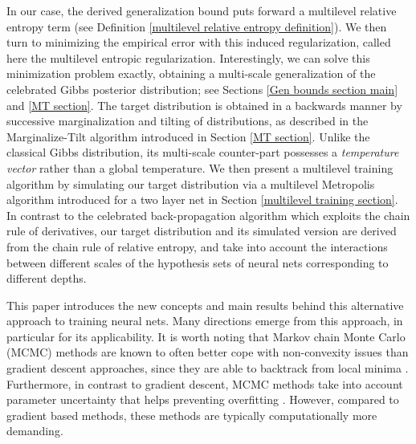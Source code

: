 \documentclass{article}
\begin{document}
In our case, the derived generalization bound puts forward a multilevel relative entropy term (see Definition \ref{multilevel relative entropy definition}). We then turn to minimizing the empirical error with this induced regularization, called here the multilevel entropic regularization. Interestingly, we can solve this minimization problem exactly, obtaining a multi-scale generalization of the celebrated Gibbs posterior distribution; see Sections \ref{Gen bounds section main} and \ref{MT section}. The  target distribution is obtained in a backwards manner by successive marginalization and tilting of distributions, as described in the Marginalize-Tilt algorithm introduced in Section \ref{MT section}. Unlike the classical Gibbs distribution, its multi-scale counter-part possesses a \emph{temperature vector} rather than a global temperature. We then present a multilevel training algorithm by simulating our target distribution via a multilevel Metropolis algorithm introduced for a two layer net in Section \ref{multilevel training section}.  In contrast to the celebrated back-propagation algorithm which exploits the chain rule of derivatives, our target distribution and its simulated version are derived from the chain rule of relative entropy, and take into account the interactions between different scales of the hypothesis sets of neural nets corresponding to different depths.

This paper introduces the new concepts and main results behind this alternative approach to training neural nets. Many directions emerge from this approach, in particular for its applicability. It is worth noting that Markov chain Monte Carlo (MCMC) methods are known to often better cope with non-convexity issues than gradient descent approaches, since they are able to backtrack from local minima \cite{geman1987stochastic}. Furthermore, in contrast to gradient descent, MCMC methods take into account parameter uncertainty that helps preventing overfitting \cite{welling2011bayesian}. However, compared to gradient based methods, these methods are typically computationally more demanding. 
\end{document}
